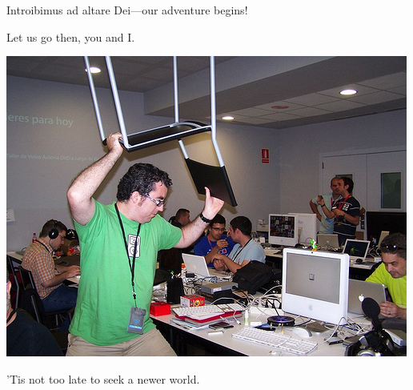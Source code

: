 \documentclass{beamer}
\begin{document}
\begin{frame}{Introibimus ad altare Dei---our adventure begins!}
\begin{center}
Let us go then, you and I.

\vspace{.25in}
\includegraphics[scale=0.33]{images/angry.jpg}
\vspace{.25in}

'Tis not too late to seek a newer world.
\end{center}
\end{frame}
\end{document}

